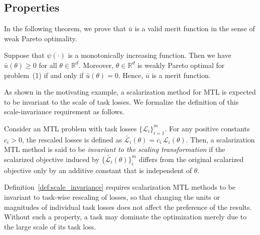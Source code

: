 \documentclass[sigconf]{acmart}
\begin{document}
\subsection{Properties}
\label{sec5}

In the following theorem, we prove that $\bar{u}$ is a valid merit function in the sense of weak Pareto optimality. 
\begin{theorem}
\label{theo:u0_merit}
Suppose that $\psi(\cdot)$ is a monotonically increasing function. Then we have $\bar{u}(\theta)\ge 0$ for all $\theta \in \mathbb{R}^d$. Moreover, $\theta \in \mathbb{R}^d$ is weakly Pareto optimal for problem~(1) if and only if $\bar{u}(\theta)= 0$. Hence, $\bar{u}$ is a merit function.
\end{theorem}

As shown in the motivating example, a scalarization method for MTL is expected to be invariant to the scale of task losses. We formalize the definition of this scale-invariance requirement as follows.

\begin{definition}
\label{def:scale_invariance}
Consider an MTL problem with task losses $\{\mathcal{L}_i\}_{i=1}^m$. For any positive constants $c_i > 0$, the rescaled losses is defined as $\bar{\mathcal{L}}_i(\theta) = c_i\,\mathcal{L}_i(\theta)$. Then, a scalarization MTL method is said to be \emph{invariant to the scaling transformation} if the scalarized objective induced by $\{ \bar{\mathcal{L}}_i(\theta)\}_i^m$ differs from the original scalarized objective only by an additive constant that is independent of \(\theta\).
\end{definition}

Definition~\ref{def:scale_invariance} requires scalarization MTL methods to be invariant to task-wise rescaling of losses, so that changing the units or magnitudes of individual task losses does not affect the preference of the results. Without such a property, a task may dominate the optimization merely due to the large scale of its task loss. 
\end{document}
